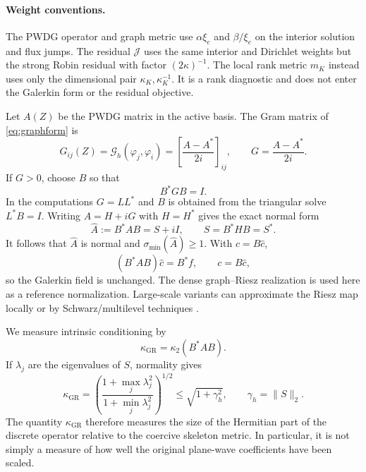 \documentclass[pdflatex,sn-mathphys-num]{sn-jnl}
\theoremstyle{thmstyleone}
\theoremstyle{thmstyletwo}
\newcommand{\GR}{\mathrm{GR}}
\begin{document}
\paragraph{Weight conventions.}
The PWDG operator and graph metric use $\alpha\xi_e$ and $\beta/\xi_e$ on the interior solution and flux jumps.  The residual $\mathcal J$ uses the same interior and Dirichlet weights but the strong Robin residual with factor $(2\kappa)^{-1}$.  The local rank metric $m_K$ instead uses only the dimensional pair $\kappa_K,\kappa_K^{-1}$.  It is a rank diagnostic and does not enter the Galerkin form or the residual objective.

Let $A(Z)$ be the PWDG matrix in the active basis.  The Gram matrix of \eqref{eq:graphform} is
\begin{equation}\label{eq:Gmatrix}
 G_{ij}(Z)=\mathcal G_h(\varphi_j,\varphi_i)
 =\left[\frac{A-A^*}{2i}\right]_{ij},
 \qquad G=\frac{A-A^*}{2i}.
\end{equation}
If $G>0$, choose $B$ so that
\begin{equation}\label{eq:Bdef}
 B^*GB=I.
\end{equation}
In the computations $G=LL^*$ and $B$ is obtained from the triangular solve $L^*B=I$.  Writing $A=H+iG$ with $H=H^*$ gives the exact normal form
\begin{equation}\label{eq:normalform}
 \widehat A:=B^*AB=S+iI,
 \qquad S=B^*HB=S^*.
\end{equation}
It follows that $\widehat A$ is normal and $\sigma_{\min}(\widehat A)\ge1$.  With $c=B\widehat c$,
\begin{equation}\label{eq:gr-solve}
 (B^*AB)\widehat c=B^*f,
 \qquad c=B\widehat c,
\end{equation}
so the Galerkin field is unchanged.  The dense graph--Riesz realization is used here as a reference normalization.  Large-scale variants can approximate the Riesz map locally or by Schwarz/multilevel techniques \cite{MardalWinther2011}.

We measure intrinsic conditioning by
\begin{equation}\label{eq:kgr}
 \kappa_{\GR}=\kappa_2(B^*AB).
\end{equation}
If $\lambda_j$ are the eigenvalues of $S$, normality gives
\begin{equation}\label{eq:kgr-exact}
 {\kappa_{\GR}
 =\left(\frac{1+\max_j\lambda_j^2}{1+\min_j\lambda_j^2}\right)^{1/2}
 \le \sqrt{1+\gamma_h^2}},
 \qquad \gamma_h=\|S\|_2.
\end{equation}
The quantity $\kappa_{\GR}$ therefore measures the size of the Hermitian part of the discrete operator relative to the coercive skeleton metric.  In particular, it is not simply a measure of how well the original plane-wave coefficients have been scaled.
\end{document}
